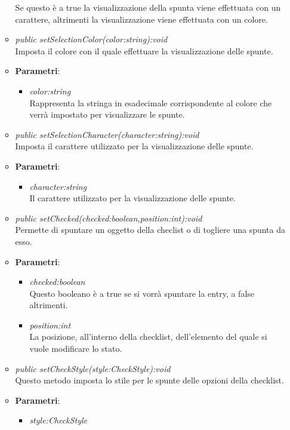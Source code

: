 \begin{itemize}
\begin{itemize}
{\begin{itemize}
			Se questo è a true la visualizzazione della spunta viene effettuata con un carattere, altrimenti la visualizzazione viene effettuata con un colore.
			\end{itemize}} 
	\item \textit{public setSelectionColor(color:string):void}\\
	Imposta il colore con il quale effettuare la visualizzazione delle spunte.
		\item{\textbf{Parametri}: \begin{itemize}
		\item \textit{color:string}\\
		Rappresenta la stringa in esadecimale corrispondente al colore che verrà impostato per visualizzare le spunte.
		\end{itemize}} 
	\item \textit{public setSelectionCharacter(character:string):void}\\
	Imposta il carattere utilizzato per la visualizzazione delle spunte.
		\item{\textbf{Parametri}: \begin{itemize}
		\item \textit{character:string}\\
		Il carattere utilizzato per la visualizzazione delle spunte.
		\end{itemize}} 
	\item \textit{public setChecked(checked:boolean,position:int):void}\\
	Permette di spuntare un oggetto della checlist o di togliere una spunta da esso.
		\item{\textbf{Parametri}: \begin{itemize}
		\item \textit{checked:boolean}\\
		Questo booleano è a true se si vorrà spuntare la entry, a false altrimenti.
		\item \textit{position:int}\\
		La posizione, all'interno della checklist, dell'elemento del quale si vuole modificare lo stato. 
		\end{itemize}} 
	\item \textit{public setCheckStyle(style:CheckStyle):void}\\
	Questo metodo imposta lo stile per le spunte delle opzioni della checklist.
		\item{\textbf{Parametri}: \begin{itemize}
		\item \textit{style:CheckStyle}\\

\end{itemize}}
\end{itemize}
\end{itemize}
